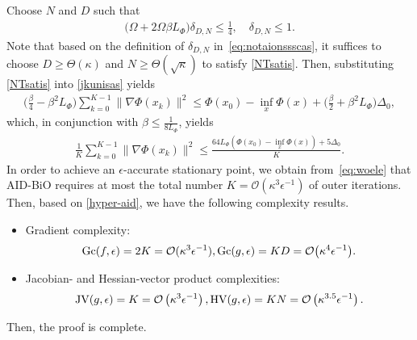 \documentclass{osudissert96}
\begin{document}
Choose $N$ and $D$ such that 
\begin{align}\label{NTsatis}
 \big(\Omega+2\Omega\beta L_\Phi\big)\delta_{D,N} \leq \frac{1}{4}, \quad \delta_{D,N}\leq 1.
\end{align}
Note that based on the definition of $\delta_{D,N}$ in~\cref{eq:notaionssscas}, it suffices to choose $D\geq\Theta(\kappa)$ and $N\geq \Theta(\sqrt{\kappa})$ to satisfy \cref{NTsatis}. Then, substituting \cref{NTsatis} into \cref{jkunisas} yields 
\begin{align*}
\Big(\frac{\beta}{4}-\beta^2 L_\Phi \Big) \sum_{k=0}^{K-1}\| \nabla \Phi(x_k)\|^2 \leq \Phi(x_0) - \inf_x\Phi(x) + \Big(\frac{\beta}{2}+\beta^2 L_\Phi\Big)\Delta_0,
\end{align*}
which, in conjunction with $\beta\leq \frac{1}{8L_\Phi}$, yields
\begin{align}\label{eq:woele}
\frac{1}{K}\sum_{k=0}^{K-1}\| \nabla \Phi(x_k)\|^2 \leq \frac{64L_\Phi (\Phi(x_0) - \inf_x\Phi(x))+5\Delta_0}{K}.  
\end{align}
In order to achieve an $\epsilon$-accurate stationary point, we obtain from~\cref{eq:woele} that 
AID-BiO requires at most the total number $K=\mathcal{O}(\kappa^3\epsilon^{-1})$ of outer iterations. 
Then, based on \cref{hyper-aid}, we have the following complexity results.
\begin{itemize}
\item Gradient complexity: $$\mbox{\normalfont Gc}(f,\epsilon)=2K=\mathcal{O}(\kappa^3\epsilon^{-1}), \mbox{\normalfont Gc}(g,\epsilon)=KD=\mathcal{O}\big(\kappa^4\epsilon^{-1}\big).$$
\item Jacobian- and Hessian-vector product complexities: $$ \mbox{\normalfont JV}(g,\epsilon)=K=\mathcal{O}\left(\kappa^3\epsilon^{-1}\right), \mbox{\normalfont HV}(g,\epsilon)=KN=\mathcal{O}\left(\kappa^{3.5}\epsilon^{-1}\right).$$
\end{itemize}
Then, the proof is complete. 
\end{document}
